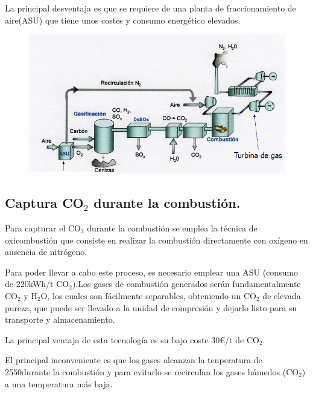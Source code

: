 La principal desventaja es que se requiere de una planta de fraccionamiento de aire(ASU) que tiene unos costes y consumo energético elevados.
\begin{figure}[H]
	\centering
	\includegraphics[width=0.7\linewidth]{res/tema3/ASU}
	\label{fig:asu}
\end{figure}

\subsection{Captura CO$_2$ durante la combustión.}
Para capturar el CO$_2$ durante la combustión se emplea la técnica de oxicombustión que consiste en realizar la combustión directamente con oxígeno en ausencia de nitrógeno.


Para poder llevar a cabo este proceso, es necesario emplear una ASU (consumo de 220kWh/t CO$_2$).Los gases de combustión generados serán fundamentalmente CO$_2$ y H$_2$O, los cuales son fácilmente
separables, obteniendo un CO$_2$ de elevada pureza, que puede ser llevado a la unidad de compresión y
dejarlo listo para su transporte y almacenamiento.


La principal ventaja de esta tecnología es su bajo coste 30€/t de CO$_2$. 


El principal inconveniente es que los gases alcanzan la tenperatura de 2550\grado durante la combustión y para evitarlo se recirculan los gases húmedos (CO$_2$) a una temperatura más baja.

